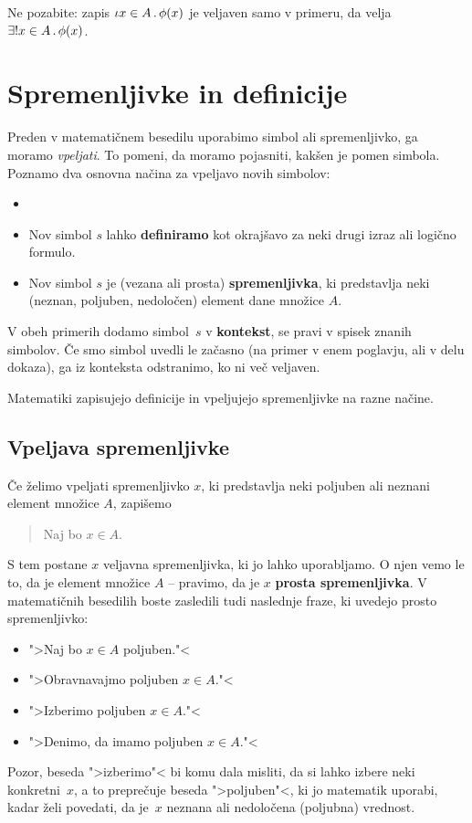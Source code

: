 \begin{opomba}
  Ne pozabite: zapis $\iota x \in A \,.\, \phi(x)$ je veljaven samo v primeru, da velja
  $\exists! x \in A \,.\, \phi(x)$.
\end{opomba}


\section{Spremenljivke in definicije}

Preden v matematičnem besedilu uporabimo simbol ali spremenljivko, ga moramo \emph{vpeljati}. To pomeni, da moramo pojasniti, kakšen je pomen simbola. Poznamo dva osnovna načina za vpeljavo novih simbolov:
%
\begin{itemize}
\item \item Nov simbol $s$ lahko \textbf{definiramo} kot okrajšavo za neki drugi izraz ali logično formulo.
\item Nov simbol $s$ je (vezana ali prosta) \textbf{spremenljivka}, ki predstavlja neki (neznan, poljuben, nedoločen) element dane množice $A$.
\end{itemize}
%
V obeh primerih dodamo simbol~$s$ v \textbf{kontekst}, se pravi v spisek znanih simbolov. Če smo simbol uvedli le začasno (na primer v enem poglavju, ali v delu dokaza), ga iz konteksta odstranimo, ko ni več veljaven.

Matematiki zapisujejo definicije in vpeljujejo spremenljivke na razne načine.

\subsection{Vpeljava spremenljivke}

Če želimo vpeljati spremenljivko $x$, ki predstavlja neki poljuben ali neznani element množice $A$, zapišemo
%
\begin{quote}
  Naj bo $x \in A$.
\end{quote}
%
S tem postane $x$ veljavna spremenljivka, ki jo lahko uporabljamo. O njen vemo le to, da je element množice $A$ -- pravimo, da je $x$ \textbf{prosta spremenljivka}. V matematičnih besedilih boste zasledili tudi naslednje fraze, ki uvedejo prosto spremenljivko:
%
\begin{itemize}
\item ">Naj bo $x \in A$ poljuben."<
\item ">Obravnavajmo poljuben $x \in A$."<
\item ">Izberimo poljuben $x \in A$."<
\item ">Denimo, da imamo poljuben $x \in A$."<
\end{itemize}
%
Pozor, beseda ">izberimo"< bi komu dala misliti, da si lahko izbere neki konkretni~$x$, a to preprečuje beseda ">poljuben"<, ki jo matematik uporabi, kadar želi povedati, da je~$x$ neznana ali nedoločena (poljubna) vrednost.

